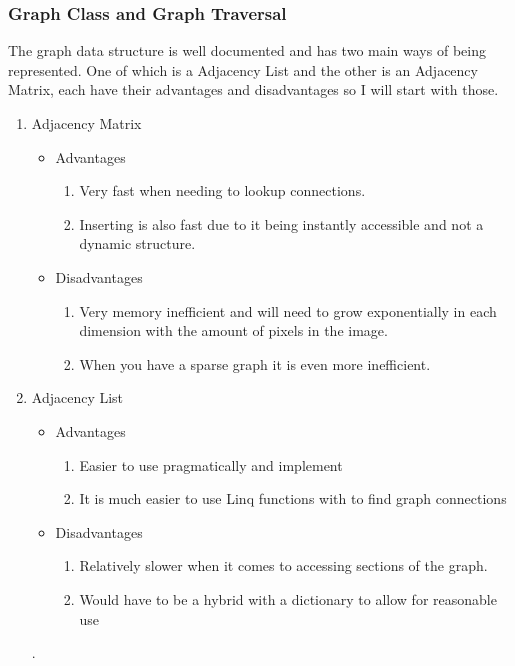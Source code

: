 \begin{FlushLeft}
        \subsubsection{Graph Class and Graph Traversal}
        The graph data structure is well documented and has two main ways of being represented. One of which is a Adjacency List and the other is an Adjacency Matrix, each have their advantages and disadvantages so I will start with those.

        \begin{enumerate}
            \item Adjacency Matrix
            \begin{itemize}
                \item Advantages
                    \begin{enumerate}
                        \item[] Very fast when needing to lookup connections.
                        \item[] Inserting is also fast due to it being instantly accessible and not a dynamic structure.
                    \end{enumerate}
                \item Disadvantages
                \begin{enumerate}
                        \item[] Very memory inefficient and will need to grow exponentially in each dimension with the amount of pixels in the image.
                        \item[] When you have a sparse graph it is even more inefficient.
                \end{enumerate}
            \end{itemize}
            \item Adjacency List
                \begin{itemize}
                    \item Advantages
                    \begin{enumerate}
                        \item[] Easier to use pragmatically and implement
                        \item[] It is much easier to use Linq functions with to find graph connections
                    \end{enumerate}
                    \item Disadvantages
                    \begin{enumerate}
                        \item[] Relatively slower when it comes to accessing sections of the graph.
                        \item[] Would have to be a hybrid with a dictionary to allow for reasonable use
                    \end{enumerate}
            \end{itemize}.
        \end{enumerate}


\end{FlushLeft}
